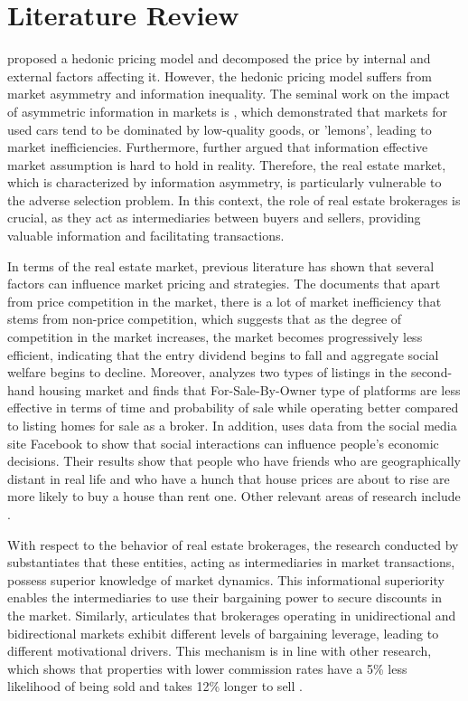 \documentclass[12pt]{article}
\begin{document}
\section{Literature Review} \label{sec:literature_review}

\citet{Rosen_hedonic} proposed a hedonic pricing model and decomposed the price by internal and external factors affecting it. However, the hedonic pricing model suffers from market asymmetry and information inequality. The seminal work on the impact of asymmetric information in markets is \citep{Akerlof_1970}, which demonstrated that markets for used cars tend to be dominated by low-quality goods, or 'lemons', leading to market inefficiencies. Furthermore, \citet{grossman_impossibility_1980} further argued that information effective market assumption is hard to hold in reality. Therefore, the real estate market, which is characterized by information asymmetry, is particularly vulnerable to the adverse selection problem. In this context, the role of real estate brokerages is crucial, as they act as intermediaries between buyers and sellers, providing valuable information and facilitating transactions.

In terms of the real estate market, previous literature has shown that several factors can influence market pricing and strategies. The \citep{550a6ccf-cde2-3dd1-979f-1a8db2b8ceb9} documents that apart from price competition in the market, there is a lot of market inefficiency that stems from non-price competition, which suggests that as the degree of competition in the market increases, the market becomes progressively less efficient, indicating that the entry dividend begins to fall and aggregate social welfare begins to decline. Moreover, \citet{hendel_relative_2009} analyzes two types of listings in the second-hand housing market and finds that For-Sale-By-Owner type of platforms are less effective in terms of time and probability of sale while operating better compared to listing homes for sale as a broker. In addition, \citet{bailey_economic_2018} uses data from the social media site Facebook to show that social interactions can influence people's economic decisions. Their results show that people who have friends who are geographically distant in real life and who have a hunch that house prices are about to rise are more likely to buy a house than rent one. Other relevant areas of research include \citep{SIRMANS1991207, NIEUWERBURGH_information, salz_intermediation_2022}.

With respect to the behavior of real estate brokerages, the research conducted by \citep{AGARWAL2019715} substantiates that these entities, acting as intermediaries in market transactions, possess superior knowledge of market dynamics. This informational superiority enables the intermediaries to use their bargaining power to secure discounts in the market. Similarly, \citet{HAN2015813} articulates that brokerages operating in unidirectional and bidirectional markets exhibit different levels of bargaining leverage, leading to different motivational drivers. This mechanism is in line with other research, which shows that properties with lower commission rates have a 5\% less likelihood of being sold and takes 12\% longer to sell \citep{10.1257/app.20160214}.
\end{document}
